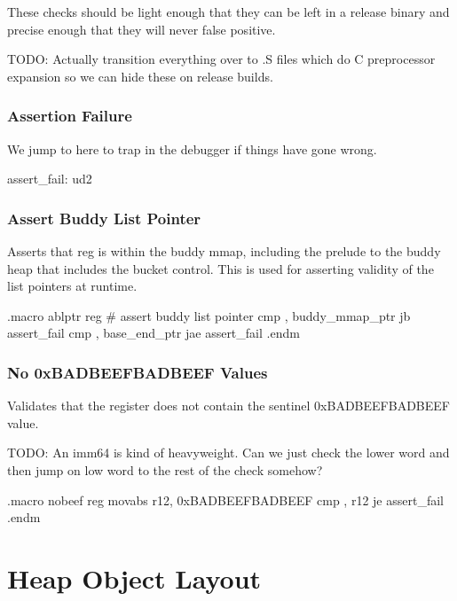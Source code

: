 These checks should be light enough that they can be left in a release binary
and precise enough that they will never false positive.

TODO: Actually transition everything over to .S files which do C preprocessor
expansion so we can hide these on release builds.

\subsubsection{Assertion Failure}

We jump to here to trap in the debugger if things have gone wrong.

\begin{asm}
assert_fail:
	ud2
\end{asm}

\subsubsection{Assert Buddy List Pointer}

Asserts that reg is within the buddy mmap, including the prelude to the buddy
heap that includes the bucket control. This is used for asserting validity of
the list pointers at runtime.

\begin{asm}
.macro ablptr reg                             # assert buddy list pointer
	cmp	\reg, buddy_mmap_ptr
	jb	assert_fail
	cmp	\reg, base_end_ptr
	jae	assert_fail
.endm
\end{asm}

\subsubsection{No 0xBADBEEFBADBEEF Values}

Validates that the register does not contain the sentinel 0xBADBEEFBADBEEF value.

TODO: An imm64 is kind of heavyweight. Can we just check the lower word and
then jump on low word to the rest of the check somehow?

\begin{asm}
.macro nobeef reg
	movabs	r12, 0xBADBEEFBADBEEF
	cmp	\reg, r12
	je	assert_fail
.endm
\end{asm}

\section{Heap Object Layout}

